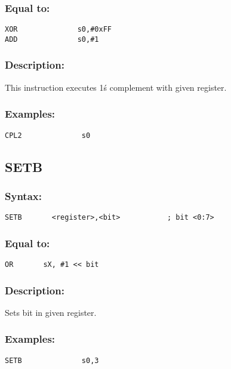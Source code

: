         \subsubsection{Equal to:}
            {
                \usecodefont
                \verb'XOR              s0,#0xFF'\\
                \verb'ADD              s0,#1'\\
            }

        \subsubsection{Description:}
            This instruction executes 1\'s complement with given register.

        \subsubsection{Examples:}
            {
                \usecodefont
                \verb'CPL2              s0'\\
            }

    \subsection{SETB}
        \subsubsection{Syntax:}
            {
                \usecodefont
                \verb'SETB       <register>,<bit>           ; bit <0:7>'
            }

        \subsubsection{Equal to:}
            {
                \usecodefont
                \verb'OR       sX, #1 << bit'
            }

        \subsubsection{Description:}
            Sets bit in given register.

        \subsubsection{Examples:}
            {
                \usecodefont
                \verb'SETB              s0,3'\\
            }

